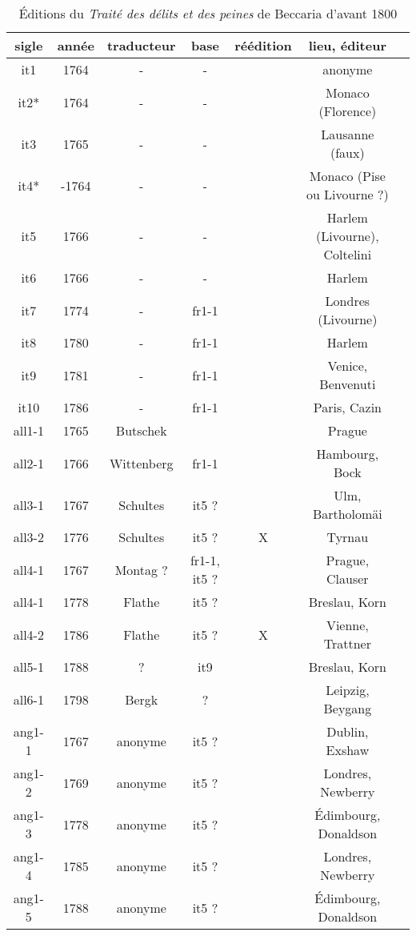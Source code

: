 \begin{longtable}{|c|c|c|c|c|c|c|}
\caption{Éditions du \emph{Traité des délits et des peines} de Beccaria d'avant 1800}
\endhead
\hline
sigle & année & traducteur & base & réédition & lieu, éditeur \\ \hline
it1 & 1764 & - & - &  & anonyme \\ \hline
it2* & 1764 & - & - &  & Monaco (Florence) \\ \hline
it3 & 1765 & - & - &  & Lausanne (faux) \\ \hline
it4* & -1764 & - & - &  & Monaco (Pise ou Livourne  ?) \\ \hline
it5 & 1766 & - & - &  & Harlem (Livourne), Coltelini \\ \hline
it6 & 1766 & - & - &  & Harlem \\ \hline
it7 & 1774 & - & fr1-1 &  & Londres (Livourne) \\ \hline
it8 & 1780 & - & fr1-1 &  & Harlem \\ \hline
it9 & 1781 & - & fr1-1 &  & Venice, Benvenuti \\ \hline
it10 & 1786 & - & fr1-1 &  & Paris, Cazin \\ \hline \hline
all1-1 & 1765 & Butschek &  &  & Prague \\ \hline
all2-1 & 1766 & Wittenberg & fr1-1 &  & Hambourg, Bock \\ \hline
all3-1 & 1767 & Schultes & it5  ? &  & Ulm, Bartholomäi \\ \hline
all3-2 & 1776 & Schultes & it5  ? & X & Tyrnau \\ \hline
all4-1 & 1767 & Montag  ? & fr1-1, it5  ? &  & Prague, Clauser \\ \hline
all4-1 & 1778 & Flathe & it5  ? &  & Breslau, Korn \\ \hline
all4-2 & 1786 & Flathe & it5  ? & X & Vienne, Trattner \\ \hline
all5-1 & 1788 & ? & it9 &  & Breslau, Korn \\ \hline
all6-1 & 1798 & Bergk & ? &  & Leipzig, Beygang \\ \hline
\pagebreak \hline ang1-1 & 1767 & anonyme & it5  ? &  & Dublin, Exshaw \\ \hline
ang1-2 & 1769 & anonyme & it5  ? &  & Londres, Newberry \\ \hline
ang1-3 & 1778 & anonyme & it5  ? &  & Édimbourg, Donaldson \\ \hline
ang1-4 & 1785 & anonyme & it5  ? &  & Londres, Newberry \\ \hline
ang1-5 & 1788 & anonyme & it5  ? &  & Édimbourg, Donaldson \\ \hline \hline

\end{longtable}
